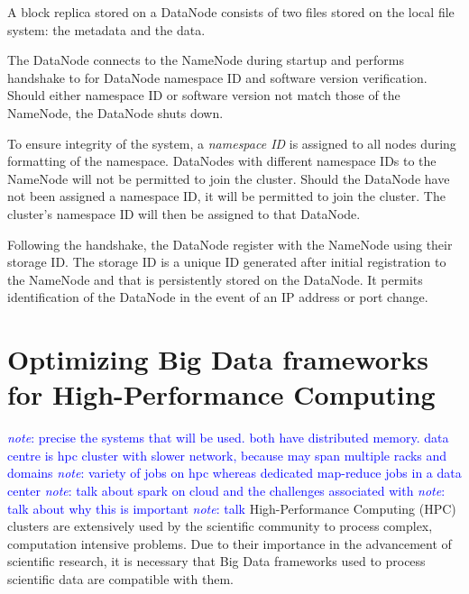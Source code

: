\documentclass{report}
\newcommand{\note}[1]{\textcolor{blue}{\textit{note}: #1}}
\begin{document}
        A block replica stored on a DataNode consists of two files stored on the
        local file system: the metadata and the data. 

        The DataNode connects to the NameNode during startup and performs
        handshake to for DataNode namespace ID and software version
        verification. Should either namespace ID or software version not match
        those of the NameNode, the DataNode shuts down.

        To ensure integrity of the system, a \textit{namespace ID} is assigned
        to all nodes during formatting of the namespace.  DataNodes with
        different namespace IDs to the NameNode will not be permitted to join
        the cluster. Should the DataNode have not been assigned a namespace ID,
        it will be permitted to join the cluster. The cluster's namespace ID
        will then be assigned to that DataNode.


        Following the handshake, the DataNode register with the NameNode using
        their storage ID. The storage ID is a unique ID generated after initial
        registration to the NameNode and that is persistently stored on the
        DataNode. It permits identification of the DataNode in the event of an
        IP address or port change. 
        

\chapter{Optimizing Big Data frameworks for High-Performance Computing}
	
    \note{precise the systems that will be used. both have distributed memory.
    data centre is hpc cluster with slower network, because may span multiple
    racks and domains} \note{variety of jobs on hpc whereas dedicated map-reduce
    jobs in a data center} \note{talk about spark on cloud and the challenges
    associated with} \note{talk about why this is important} \note{talk }
    High-Performance Computing (HPC) clusters are extensively used by the
    scientific community to process complex, computation intensive problems. Due
    to their importance in the advancement of scientific research, it is
    necessary that Big Data frameworks used to process scientific data are
    compatible with them. 
	
\end{document}
